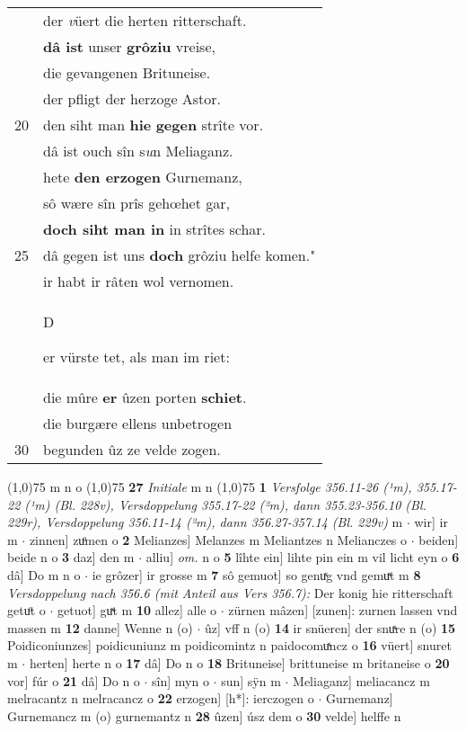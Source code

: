 \documentclass[8pt,a4paper,notitlepage]{article}
\begin{document}
\begin{table}[ht]
\begin{minipage}[t]{0.5\linewidth}
\begin{tabular}{rl}
 & der \textit{v}üert die herten ritterschaft.\\ 
 & \textbf{dâ ist} unser \textbf{grôziu} vreise,\\ 
 & die gevangenen Brituneise.\\ 
 & der pfligt der herzoge Astor.\\ 
20 & den siht man \textbf{hie} \textbf{gegen} strîte vor.\\ 
 & dâ ist ouch sîn s\textit{u}n Meliaganz.\\ 
 & hete \textbf{den erzogen} Gurnemanz,\\ 
 & sô wære sîn prîs gehœhet gar,\\ 
 & \textbf{doch siht man in} in strîtes schar.\\ 
25 & dâ gegen ist uns \textbf{doch} grôziu helfe komen."\\ 
 & ir habt ir râten wol vernomen.\\ 
 & \begin{large}D\end{large}er vürste tet, als man im riet:\\ 
 & die mûre \textbf{er} ûzen porten \textbf{schiet}.\\ 
 & die burgære ellens unbetrogen\\ 
30 & begunden ûz ze velde zogen.\\ 
\end{tabular}
\scriptsize
\line(1,0){75} \newline
m n o \newline
\line(1,0){75} \newline
\textbf{27} \textit{Initiale} m n  \newline
\line(1,0){75} \newline
\textbf{1} \textit{Versfolge 356.11-26 (¹m), 355.17-22 (¹m) (Bl. 228v), Versdoppelung 355.17-22 (²m), dann 355.23-356.10 (Bl. 229r), Versdoppelung 356.11-14 (²m), dann 356.27-357.14 (Bl. 229v)} m   $\cdot$ wir] ir m  $\cdot$ zinnen] zuͦmen o \textbf{2} Melianzes] Melanzes m Meliantzes n Melianczes o  $\cdot$ beiden] beide n o \textbf{3} daz] den m  $\cdot$ alliu] \textit{om.} n o \textbf{5} lîhte ein] lihte pin ein m vil licht eyn o \textbf{6} dâ] Do m n o  $\cdot$ ie grôzer] ir grosse m \textbf{7} sô gemuot] so genuͯg vnd gemuͯt m \textbf{8} \textit{Versdoppelung nach 356.6 (mit Anteil aus Vers 356.7):} Der konig hie ritterschaft getuͦt o   $\cdot$ getuot] guͯt m \textbf{10} allez] alle o  $\cdot$ zürnen mâzen] [zunen]: zurnen lassen vnd massen m \textbf{12} danne] Wenne n (o)  $\cdot$ ûz] vff n (o) \textbf{14} ir snüeren] der snuͯre n (o) \textbf{15} Poidiconiunzes] poidicuniunz m poidicomintz n paidocomuͯncz o \textbf{16} vüert] snuret m  $\cdot$ herten] herte n o \textbf{17} dâ] Do n o \textbf{18} Brituneise] brittuneise m britaneise o \textbf{20} vor] fúr o \textbf{21} dâ] Do n o  $\cdot$ sîn] myn o  $\cdot$ sun] sÿn m  $\cdot$ Meliaganz] meliacancz m melracantz n melracancz o \textbf{22} erzogen] [h*]: ierczogen o  $\cdot$ Gurnemanz] Gurnemancz m (o) gurnemantz n \textbf{28} ûzen] úsz dem o \textbf{30} velde] helffe n \newline
\end{minipage}
\end{table}
\end{document}
